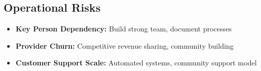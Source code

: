 \subsection{Operational Risks}
\begin{itemize}
  \item \textbf{Key Person Dependency:} Build strong team, document processes
  \item \textbf{Provider Churn:} Competitive revenue sharing, community building
  \item \textbf{Customer Support Scale:} Automated systems, community support model
\end{itemize}